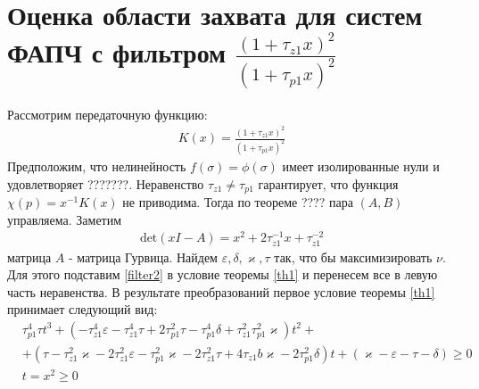 \documentclass[a4paper,14pt]{extarticle} %
\begin{document}
\section{Оценка области захвата для систем ФАПЧ с фильтром $\frac{(1+\tau_{z1}x)^2}{(1+\tau_{p1}x)^2}$}
 Рассмотрим передаточную функцию:
 \begin{equation}\label{filter2}
 \begin{aligned}
K(x) = \frac{(1+\tau_{z1}x)^2}{(1+\tau_{p1}x)^2}
 \end{aligned}
\end{equation}
Предположим, что нелинейность $f(\sigma)=\phi(\sigma)$ имеет изолированные нули и удовлетворяет ???????.
Неравенство $\tau_{z1} \neq \tau_{p1}$ гарантирует, что функция $\chi(p) = x^{-1}K(x)$ не приводима. Тогда по теореме ???? пара $(A,B)$ управляема. Заметим
 \begin{equation}
 \begin{aligned}
\text{det}(xI-A) = x^2 + 2\tau_{z1}^{-1}x + \tau_{z1}^{-2}
 \end{aligned}
\end{equation}
матрица $A$ - матрица Гурвица. Найдем $\varepsilon, \delta, \varkappa, \tau$ так, что бы максимизировать $\nu$. Для этого подставим \eqref{filter2} в условие теоремы \ref{th1} и перенесем все в левую часть неравенства. В результате преобразований первое условие теоремы \ref{th1} принимает следующий вид:
 \begin{equation}\label{second_condition}
 \begin{aligned}
&\tau_{p1}^4\tau t^3 +(- \tau_{z1}^4\varepsilon - \tau_{z1}^4\tau + 2\tau_{p1}^2\tau- \tau_{p1}^4\delta + \tau_{z1}^2\tau_{p1}^2\varkappa)t^2  +\\
&+( \tau- \tau_{z1}^2\varkappa - 2\tau_{z1}^2\varepsilon - \tau_{p1}^2\varkappa- 2\tau_{z1}^2\tau+ 4\tau_{z1}b\varkappa- 2\tau_{p1}^2\delta)t + (\varkappa-\varepsilon - \tau - \delta)  \geq 0\\
&t = x^2 \geq 0
 \end{aligned}
\end{equation}
\end{document}
